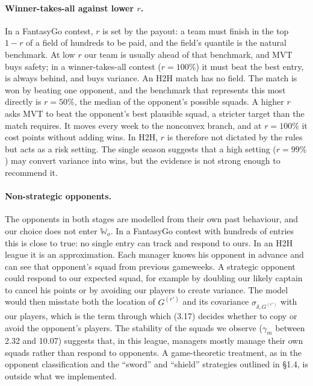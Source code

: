 \documentclass[12pt,oneside,a4paper]{book}
\theoremstyle{definition}
\theoremstyle{remark}
\begin{document}
	\paragraph{Winner-takes-all against lower $r$.} In a FantasyGo contest, $r$ is set by the
	payout: a team must finish in the top $1-r$ of a field of hundreds to be paid, and the field's
	quantile is the natural benchmark. At low $r$ our team is usually ahead of that benchmark, and
	MVT buys safety; in a winner-takes-all contest ($r=100\%$) it must beat the best entry, is
	always behind, and buys variance. An H2H match has no field. The match is won by beating one
	opponent, and the benchmark that represents this most directly is $r=50\%$, the median of the
	opponent's possible squads. A higher $r$ asks MVT to beat the opponent's best plausible squad,
	a stricter target than the match requires. It moves every week to the nonconvex branch, and at
	$r=100\%$ it cost points without adding wins. In H2H, $r$ is therefore not dictated by the
	rules but acts as a risk setting. The single season suggests that a high setting ($r=99\%$) may
	convert variance into wins, but the evidence is not strong enough to recommend it.

	\paragraph{Non-strategic opponents.} The opponents in both stages are modelled from their own
	past behaviour, and our choice does not enter $\mathbb{W}_o$. In a FantasyGo contest with
	hundreds of entries this is close to true: no single entry can track and respond to ours. In an
	H2H league it is an approximation. Each manager knows his opponent in advance and can see that
	opponent's squad from previous gameweeks. A strategic opponent could respond to our expected
	squad, for example by doubling our likely captain to cancel his points or by avoiding our
	players to create variance. The model would then misstate both the location of $G^{(r')}$ and
	its covariance $\sigma_{\delta,G^{(r')}}$ with our players, which is the term through which
	(3.17) decides whether to copy or avoid the opponent's players. The stability of the squads we
	observe ($\gamma_m$ between 2.32 and 10.07) suggests that, in this league, managers mostly
	manage their own squads rather than respond to opponents. A game-theoretic treatment, as in the
	opponent classification and the ``sword'' and ``shield'' strategies outlined in §1.4, is
	outside what we implemented.
\end{document}
